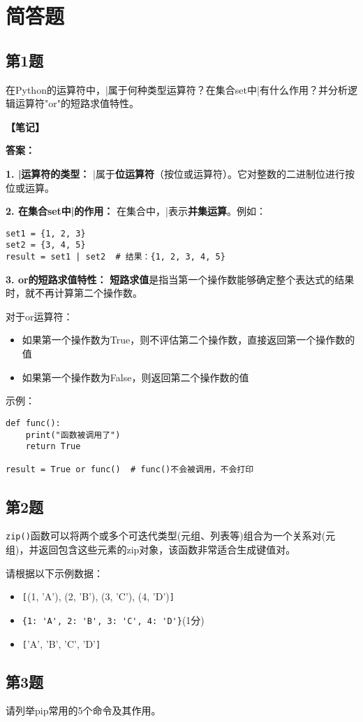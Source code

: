 \section{简答题}

\subsection{第1题}
在Python的运算符中，|属于何种类型运算符？在集合set中|有什么作用？并分析逻辑运算符"or"的短路求值特性。

\begin{mdframed}[linewidth=1pt, linecolor=black]

  \textbf{\color{red}【笔记】}

  \textbf{答案：}

  \textbf{1. |运算符的类型：}
  \qquad |属于\textbf{位运算符}（按位或运算符）。它对整数的二进制位进行按位或运算。

  \textbf{2. 在集合set中|的作用：}
  \qquad 在集合中，|表示\textbf{并集运算}。例如：
  \begin{lstlisting}
set1 = {1, 2, 3}
set2 = {3, 4, 5}
result = set1 | set2  # 结果：{1, 2, 3, 4, 5}
  \end{lstlisting}

  \textbf{3. or的短路求值特性：}
  \qquad \textbf{短路求值}是指当第一个操作数能够确定整个表达式的结果时，就不再计算第二个操作数。

  \qquad 对于or运算符：
  \begin{itemize}
    \item 如果第一个操作数为True，则不评估第二个操作数，直接返回第一个操作数的值
    \item 如果第一个操作数为False，则返回第二个操作数的值
  \end{itemize}

  \qquad 示例：
  \begin{lstlisting}
def func():
    print("函数被调用了")
    return True

result = True or func()  # func()不会被调用，不会打印
  \end{lstlisting}

\end{mdframed}

\subsection{第2题}
\texttt{zip()}函数可以将两个或多个可迭代类型(元组、列表等)组合为一个关系对(元组)，并返回包含这些元素的zip对象，该函数非常适合生成键值对。

请根据以下示例数据：
\begin{itemize}
  \item \verb|[|(1, 'A'), (2, 'B'), (3, 'C'), (4, 'D')\verb|]|
  \item \verb|{1: 'A', 2: 'B', 3: 'C', 4: 'D'}|(1分)
  \item \verb|[|'A', 'B', 'C', 'D'\verb|]|
\end{itemize}

\subsection{第3题}
请列举pip常用的5个命令及其作用。
